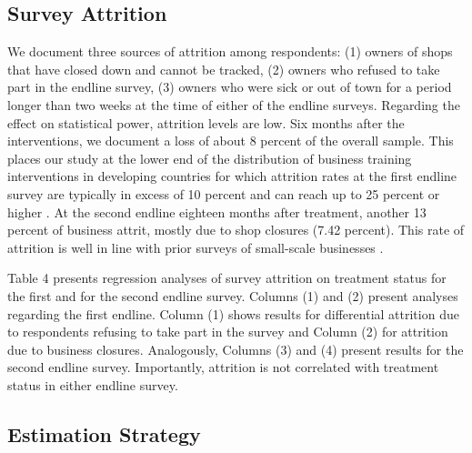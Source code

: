 \documentclass[11.5pt]{article}
\begin{document}
\subsection{Survey Attrition}

We document three sources of attrition among respondents: (1) owners of shops that have closed down and cannot be tracked, (2) owners who refused to take part in the endline survey, (3) owners who were sick or out of town for a period longer than two weeks at the time of either of the endline surveys. Regarding the effect on statistical power, attrition levels are low. Six months after the interventions, we document a loss of about 8 percent of the overall sample. This places our study at the lower end of the distribution of business training interventions in developing countries for which attrition rates at the first endline survey are typically in excess of 10 percent and can reach up to 25 percent or higher \citep[for a review, see][]{McKenzie2014}. At the second endline eighteen months after treatment, another 13 percent of business attrit, mostly due to shop closures (7.42 percent). This rate of attrition is well in line with prior surveys of small-scale businesses \citep{McKenzie2014}.

Table 4 presents regression analyses of survey attrition on treatment status for the first and for the second endline survey. Columns (1) and (2) present analyses regarding the first endline. Column (1) shows results for differential attrition due to respondents refusing to take part in the survey and Column (2) for attrition due to business closures. Analogously, Columns (3) and (4) present results for the second endline survey. Importantly, attrition is not correlated with treatment status in either endline survey.


\subsection{Estimation Strategy}

\end{document}
